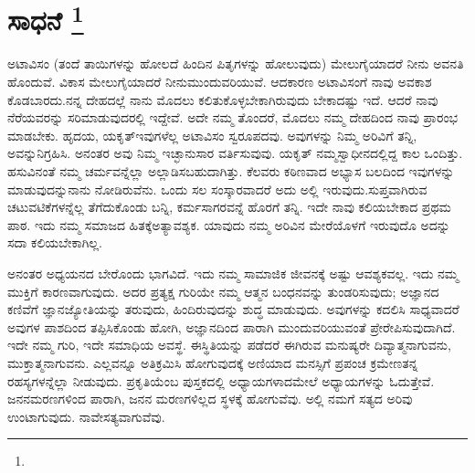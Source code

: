 
\vspace{-1cm}

\chapter[ಸಾಧನೆ ]{ಸಾಧನೆ \protect\footnote{}}

ಅಟಾವಿಸಂ (ತಂದೆ ತಾಯಿಗಳನ್ನು ಹೋಲದೆ ಹಿಂದಿನ ಪಿತೃಗಳನ್ನು ಹೋಲುವುದು) ಮೇಲುಗೈಯಾದರೆ ನೀನು ಅವನತಿ ಹೊಂದುವೆ. ವಿಕಾಸ ಮೇಲುಗೈಯಾದರೆ ನೀನು\break ಮುಂದುವರಿಯುವೆ. ಆದಕಾರಣ ಅಟಾವಿಸಂಗೆ ನಾವು ಅವಕಾಶ ಕೊಡಬಾರದು.\break ನನ್ನ ದೇಹದಲ್ಲೆ ನಾನು ಮೊದಲು ಕಲಿತುಕೊಳ್ಳಬೇಕಾಗಿರುವುದು ಬೇಕಾದಷ್ಟು ಇದೆ. ಆದರೆ ನಾವು ನೆರೆಯವರನ್ನು ಸರಿಮಾಡುವುದರಲ್ಲಿ ಇದ್ದೇವೆ. ಅದೇ ನಮ್ಮ ತೊಂದರೆ, ಮೊದಲು ನಮ್ಮ ದೇಹದಿಂದ ನಾವು ಪ್ರಾರಂಭ ಮಾಡಬೇಕು. ಹೃದಯ, ಯಕೃತ್​\break ಇವುಗಳೆಲ್ಲ ಅಟಾವಿಸಂ ಸ್ವರೂಪದವು. ಅವುಗಳನ್ನು ನಿಮ್ಮ ಅರಿವಿಗೆ ತನ್ನಿ, ಅವನ್ನು\break ನಿಗ್ರಹಿಸಿ. ಅನಂತರ ಅವು ನಿಮ್ಮ ಇಚ್ಛಾನುಸಾರ ವರ್ತಿಸುವುವು. ಯಕೃತ್​ ನಮ್ಮ\break ಸ್ವಾಧೀನದಲ್ಲಿದ್ದ ಕಾಲ ಒಂದಿತ್ತು. ಹಸುವಿನಂತೆ ನಮ್ಮ ಚರ್ಮವನ್ನೆಲ್ಲಾ ಅಲ್ಲಾಡಿಸಬಹುದಾಗಿತ್ತು. ಕೆಲವರು ಕಠಿಣವಾದ ಅಭ್ಯಾಸ ಬಲದಿಂದ ಇವುಗಳನ್ನು ಮಾಡುವುದನ್ನು\break ನಾನು ನೋಡಿರುವೆನು. ಒಂದು ಸಲ ಸಂಸ್ಕಾರವಾದರೆ ಅದು ಅಲ್ಲಿ ಇರುವುದು.\break ಸುಪ್ತವಾಗಿರುವ ಚಟುವಟಿಕೆಗಳನ್ನೆಲ್ಲ ತೆಗೆದುಕೊಂಡು ಬನ್ನಿ, ಕರ್ಮಸಾಗರವನ್ನೆ ಹೊರಗೆ ತನ್ನಿ. ಇದೇ ನಾವು ಕಲಿಯಬೇಕಾದ ಪ್ರಥಮ ಪಾಠ. ಇದು ನಮ್ಮ ಸಮಾಜದ ಹಿತಕ್ಕೆ\break ಅತ್ಯಾವಶ್ಯಕ. ಯಾವುದು ನಮ್ಮ ಅರಿವಿನ ಮೇರೆಯೊಳಗೆ ಇರುವುದೊ ಅದನ್ನು ಸದಾ ಕಲಿಯಬೇಕಾಗಿಲ್ಲ.

ಅನಂತರ ಅಧ್ಯಯನದ ಬೇರೊಂದು ಭಾಗವಿದೆ. ಇದು ನಮ್ಮ ಸಾಮಾಜಿಕ ಜೀವನಕ್ಕೆ ಅಷ್ಟು ಆವಶ್ಯಕವಲ್ಲ. ಇದು ನಮ್ಮ ಮುಕ್ತಿಗೆ ಕಾರಣವಾಗುವುದು. ಅದರ ಪ್ರತ್ಯಕ್ಷ ಗುರಿಯೇ ನಮ್ಮ ಆತ್ಮನ ಬಂಧನವನ್ನು ತುಂಡರಿಸುವುದು; ಅಜ್ಞಾನದ ಕಣಿವೆಗೆ ಜ್ಞಾನಜ್ಯೋತಿಯನ್ನು ತರುವುದು, ಹಿಂದಿರುವುದನ್ನು ಶುದ್ಧ ಮಾಡುವುದು. ಅವುಗಳನ್ನು ಕದಲಿಸಿ ಸಾಧ್ಯವಾದರೆ ಅವುಗಳ ಪಾಶದಿಂದ ತಪ್ಪಿಸಿಕೊಂಡು ಹೋಗಿ, ಅಜ್ಞಾನದಿಂದ ಪಾರಾಗಿ ಮುಂದುವರಿಯುವಂತೆ ಪ್ರೇರೇಪಿಸುವುದಾಗಿದೆ. ಇದೇ ನಮ್ಮ ಗುರಿ, ಇದೇ ಸಮಾಧಿಯ ಅವಸ್ಥೆ. ಈ\break ಸ್ಥಿತಿಯನ್ನು ಪಡೆದರೆ ಈಗಿರುವ ಮನುಷ್ಯರೇ ದಿವ್ಯಾತ್ಮನಾಗುವನು, ಮುಕ್ತಾತ್ಮನಾಗುವನು. ಎಲ್ಲವನ್ನೂ ಅತಿಕ್ರಮಿಸಿ ಹೋಗುವುದಕ್ಕೆ ಅಣಿಯಾದ ಮನಸ್ಸಿಗೆ ಪ್ರಪಂಚ ಕ್ರಮೇಣ\break ತನ್ನ ರಹಸ್ಯಗಳನ್ನೆಲ್ಲಾ ನೀಡುವುದು. ಪ್ರಕೃತಿಯೆಂಬ ಪುಸ್ತಕದಲ್ಲಿ ಅಧ್ಯಾಯಗಳಾದ\break ಮೇಲೆ ಅಧ್ಯಾಯಗಳನ್ನು ಓದುತ್ತೇವೆ. ಜನನಮರಣಗಳಿಂದ ಪಾರಾಗಿ, ಜನನ ಮರಣಗಳಿಲ್ಲದ ಸ್ಥಳಕ್ಕೆ ಹೋಗುವೆವು. ಅಲ್ಲಿ ನಮಗೆ ಸತ್ಯದ ಅರಿವು ಉಂಟಾಗುವುದು. ನಾವೇ\break ಸತ್ಯವಾಗುವೆವು.

